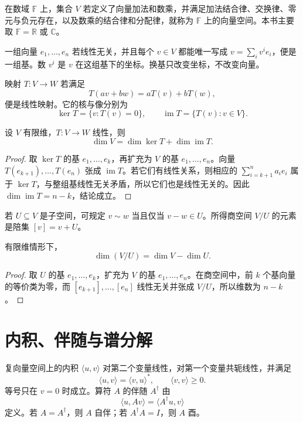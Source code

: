 \begin{definition}[向量空间]
在数域 \(\mathbb F\) 上，集合 \(V\) 若定义了向量加法和数乘，并满足加法结合律、交换律、零元与负元存在，以及数乘的结合律和分配律，就称为 \(\mathbb F\) 上的向量空间。本书主要取
\(\mathbb F=\mathbb R\) 或 \(\mathbb C\)。
\end{definition}

一组向量 \(e_1,\ldots,e_n\) 若线性无关，并且每个 \(v\in V\) 都能唯一写成 \(v=\sum_i v^ie_i\)，便是一组基。数 \(v^i\) 是 \(v\) 在这组基下的坐标。换基只改变坐标，不改变向量。

映射 \(T:V\to W\) 若满足
\[
T(av+bw)=aT(v)+bT(w),
\]
便是线性映射。它的核与像分别为
\[
\ker T=\{v:T(v)=0\},\qquad
\operatorname{im}T=\{T(v):v\in V\}.
\]

\begin{theorem}[秩--零化度定理]
设 \(V\) 有限维，\(T:V\to W\) 线性，则
\[
\dim V=\dim\ker T+\dim\operatorname{im}T.
\]
\end{theorem}

\begin{proof}
取 \(\ker T\) 的基 \(e_1,\ldots,e_k\)，再扩充为 \(V\) 的基
\(e_1,\ldots,e_n\)。向量
\(T(e_{k+1}),\ldots,T(e_n)\) 张成 \(\operatorname{im}T\)。若它们有线性关系，则相应的
\(\sum_{i=k+1}^na_ie_i\) 属于 \(\ker T\)，与整组基线性无关矛盾，所以它们也是线性无关的。因此
\(\dim\operatorname{im}T=n-k\)，结论成立。
\end{proof}

若 \(U\subseteq V\) 是子空间，可规定 \(v\sim w\) 当且仅当
\(v-w\in U\)。所得商空间 \(V/U\) 的元素是陪集
\([v]=v+U\)。

\begin{proposition}[商空间维数]
有限维情形下，
\[
\dim(V/U)=\dim V-\dim U.
\]
\end{proposition}

\begin{proof}
取 \(U\) 的基 \(e_1,\ldots,e_k\)，扩充为 \(V\) 的基
\(e_1,\ldots,e_n\)。在商空间中，前 \(k\) 个基向量的等价类为零，而
\([e_{k+1}],\ldots,[e_n]\) 线性无关并张成 \(V/U\)，所以维数为
\(n-k\)。
\end{proof}

\section{内积、伴随与谱分解}

复向量空间上的内积 \(\langle u,v\rangle\) 对第二个变量线性，对第一个变量共轭线性，并满足
\[
\langle u,v\rangle=\langle v,u\rangle^*,\qquad
\langle v,v\rangle\ge0.
\]
等号只在 \(v=0\) 时成立。算符 \(A\) 的伴随 \(A^\dagger\) 由
\[
\langle u,Av\rangle=\langle A^\dagger u,v\rangle
\]
定义。若 \(A=A^\dagger\)，则 \(A\) 自伴；若
\(A^\dagger A=I\)，则 \(A\) 酉。

